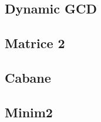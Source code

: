 \documentclass{llncs}
\begin{document}
\subsection{Dynamic GCD \cite{website:timus/gcd}}
\subsection{Matrice 2 \cite{website:infoarena/matrice2}}
\subsection{Cabane \cite{website:infoarena/cabane}}
\subsection{Minim2 \cite{website:infoarena/minim2}}


\clearpage


\end{document}
